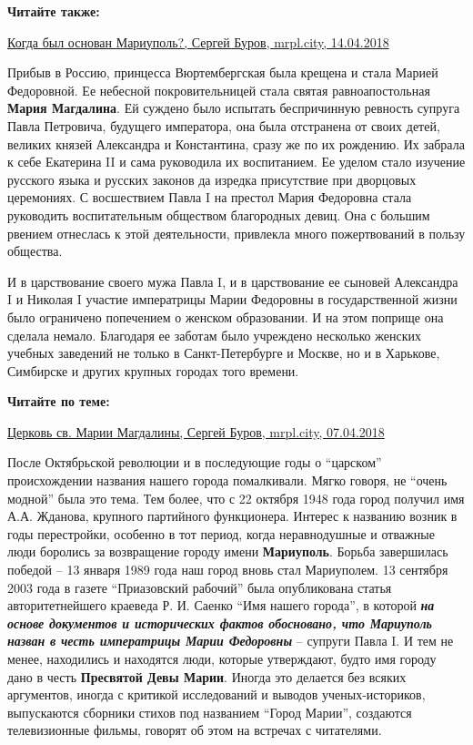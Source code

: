 \textbf{Читайте также:} 

\href{https://archive.org/details/14_04_2018.sergij_burov.mrpl_city.kogda_byl_osnovan_mariupol}{%
Когда был основан Мариуполь?, Сергей Буров, mrpl.city, 14.04.2018}

Прибыв в Россию, принцесса Вюртембергская была крещена и стала Марией
Федоровной. Ее небесной покровительницей стала святая равноапостольная \textbf{Мария
Магдалина}. Ей суждено было испытать беспричинную ревность супруга Павла
Петровича, будущего императора, она была отстранена от своих детей, великих
князей Александра и Константина, сразу же по их рождению. Их забрала к себе
Екатерина II и сама руководила их воспитанием. Ее уделом стало изучение
русского языка и русских законов да изредка присутствие при дворцовых
церемониях. С восшествием Павла I на престол Мария Федоровна стала руководить
воспитательным обществом благородных девиц. Она с большим рвением отнеслась к
этой деятельности, привлекла много пожертвований в пользу общества. 

И в царствование своего мужа Павла I, и в царствование ее сыновей Александра I
и Николая I участие императрицы Марии Федоровны в государственной жизни было
ограничено попечением о женском образовании. И на этом поприще она сделала
немало. Благодаря ее заботам было учреждено несколько женских учебных заведений
не только в Санкт-Петербурге и Москве, но и в Харькове, Симбирске и других
крупных городах того времени.

\textbf{Читайте по теме:} 

\href{https://archive.org/details/07_04_2018.sergij_burov.mrpl_city.cerkov_sv_marii_magdaliny}{%
Церковь св. Марии Магдалины, Сергей Буров, mrpl.city, 07.04.2018}

После Октябрьской революции и в последующие годы о \enquote{царском}
происхождении названия нашего города помалкивали. Мягко говоря, не
\enquote{очень модной} была это тема. Тем более, что с 22 октября 1948 года
город получил имя А.А. Жданова, крупного партийного функционера. Интерес к
названию возник в годы перестройки, особенно в тот период, когда неравнодушные
и отважные люди боролись за возвращение городу имени \textbf{Мариуполь}. Борьба
завершилась победой – 13 января 1989 года наш город вновь стал Мариуполем. 13
сентября 2003 года в газете \enquote{Приазовский рабочий} была опубликована
статья авторитетнейшего краеведа Р. И.  Саенко \enquote{Имя нашего города}, в
которой {\em\bfseries на основе документов и исторических фактов обосновано,
что Мариуполь назван в честь императрицы Марии Федоровны} – супруги Павла I. И
тем не менее, находились и находятся люди, которые утверждают, будто имя городу
дано в честь \textbf{Пресвятой Девы Марии}. Иногда это делается без всяких
аргументов, иногда с критикой исследований и выводов ученых-историков,
выпускаются сборники стихов под названием \enquote{Город Марии}, создаются
телевизионные фильмы, говорят об этом на встречах с читателями.

